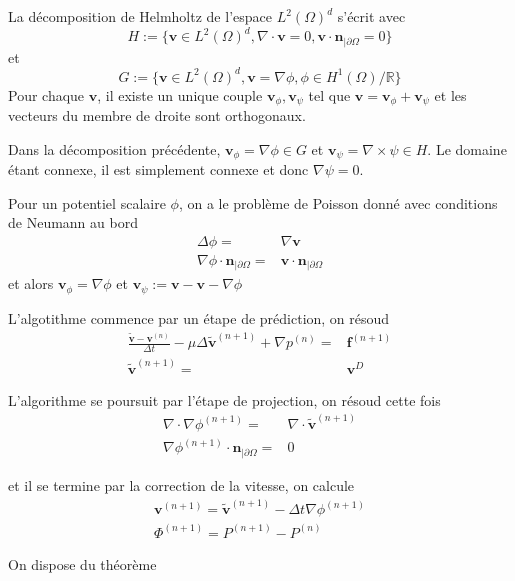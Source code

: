 La décomposition de Helmholtz de l'espace $L^2(\Omega)^d$ s'écrit avec $$ H := \{ \mathbf{v} \in L^2(\Omega)^d, \nabla \cdot \mathbf{v} = 0, \mathbf{v} \cdot \mathbf{n}_{|\partial \Omega} = 0 \} $$ et $$ G := \{ \mathbf{v} \in L^2(\Omega)^d, \mathbf{v} = \nabla \phi, \phi \in H^1(\Omega)/\mathbb{R} \} $$
Pour chaque $\mathbf{v}$, il existe un unique couple $\mathbf{v}_{\phi}, \mathbf{v}_{\psi}$ tel que $\mathbf{v} = \mathbf{v}_{\phi} + \mathbf{v}_\psi$ et les vecteurs du membre de droite sont orthogonaux.

Dans la décomposition précédente, $\mathbf{v}_\phi = \nabla \phi \in G$ et $\mathbf{v}_\psi = \nabla \times \psi \in H$. Le domaine étant connexe, il est simplement connexe et donc $\nabla \psi = 0$.

Pour un potentiel scalaire $\phi$, on a le problème de Poisson donné avec conditions de Neumann au bord
\begin{align*}
    \Delta \phi = & \nabla \mathbf{v} \\
    \nabla \phi \cdot \mathbf{n}_{|\partial \Omega} = & \mathbf{v} \cdot \mathbf{n}_{|\partial \Omega}
\end{align*}
et alors $\mathbf{v}_\phi = \nabla \phi$ et $\mathbf{v}_\psi := \mathbf{v} - \mathbf{v} - \nabla \phi$

L'algotithme commence par un étape de prédiction, on résoud
\begin{align*}
    \frac{\tilde{\mathbf{v}} - \mathbf{v}^{(n)}}{\Delta t} - \mu \Delta \tilde{\mathbf{v}}^{(n+1)} + \nabla p^{(n)} = & \mathbf{f}^{(n+1)} \\
    \tilde{\mathbf{v}}^{(n+1)} = & \mathbf{v}^D
\end{align*}

L'algorithme se poursuit par l'étape de projection, on résoud cette fois
\begin{align*}
    \nabla \cdot \nabla \phi^{(n+1)} = & \nabla \cdot \tilde{\mathbf{v}}^{(n+1)} \\
    \nabla \phi^{(n+1)} \cdot \mathbf{n}_{|\partial \Omega} = & 0
\end{align*}

et il se termine par la correction de la vitesse, on calcule
\begin{align*}
    \mathbf{v}^{(n+1)} = \tilde{\mathbf{v}}^{(n+1)} - \Delta t \nabla \phi^{(n+1)} \\
    \Phi^{(n+1)} = P^{(n+1)} - P^{(n)}
\end{align*}

On dispose du théorème

